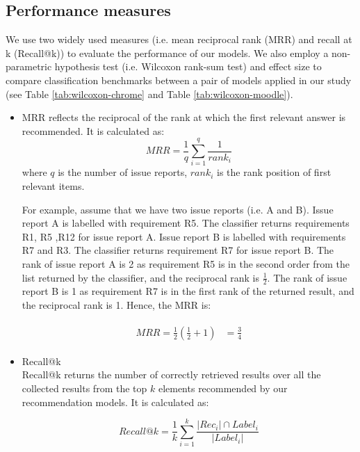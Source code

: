 \subsection{Performance measures}

We use two widely used measures (i.e. mean reciprocal rank (MRR) and recall at k (Recall@k)) to evaluate the performance of our models. We also employ a non-parametric hypothesis test (i.e. Wilcoxon rank-sum test) and effect size to compare classification benchmarks between a pair of models applied in our study (see Table \ref{tab:wilcoxon-chrome} and Table \ref{tab:wilcoxon-moodle}). \\

\begin{itemize}[leftmargin=3mm]
	\item MRR \cite{Almhana2016, Ye2019} reflects the reciprocal of the rank at which the first relevant answer is recommended. It is calculated as:
	\begin{equation}
		MRR = \frac{1}{q}\sum_{i = 1}^{q}\frac{1}{rank_{i}}
	\end{equation}
	where $q$ is the number of issue reports, $ rank_{i} $ is the rank position of first relevant items. 
	
	For example, assume that we have two issue reports (i.e. A and B). Issue report A is labelled with requirement R5. The classifier returns requirements {R1, R5 ,R12} for issue report A. Issue report B is labelled with requirements {R7 and R3}. The classifier returns requirement R7 for issue report B. The rank of issue report A is 2 as requirement R5 is in the second order from the list returned by the classifier, and the reciprocal rank is $\frac{1}{2}$. The rank of issue report B is 1 as requirement R7 is in the first rank of the returned result, and the reciprocal rank is 1. Hence, the MRR is:
	
	\begin{align}
		\begin{split}
			MRR = \frac{1}{2} \left ( \frac{1}{2} + 1\right )
			&= \frac{3}{4}
		\end{split}
	\end{align}
	
	\item Recall@k \\
	Recall@k returns the number of correctly retrieved results over all the collected results from the top $k$ elements recommended by our recommendation models. It is calculated as:
	
	\begin{equation}
		Recall@k = \frac{1}{k}\sum_{i=1}^{k}\frac{\lvert{Rec_{i}\rvert \cap Label_{i}}}{\lvert{Label_{i}\rvert}}
	\end{equation}
	

\end{itemize}
